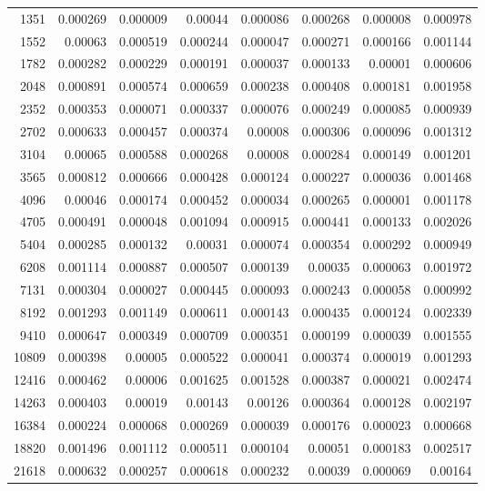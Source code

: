 \begin{tabular}{r r r r r r r r}
1351 & 0.000269 & 0.000009 & 0.00044 & 0.000086 & 0.000268 & 0.000008 & 0.000978 \\
1552 & 0.00063 & 0.000519 & 0.000244 & 0.000047 & 0.000271 & 0.000166 & 0.001144 \\
1782 & 0.000282 & 0.000229 & 0.000191 & 0.000037 & 0.000133 & 0.00001 & 0.000606 \\
2048 & 0.000891 & 0.000574 & 0.000659 & 0.000238 & 0.000408 & 0.000181 & 0.001958 \\
2352 & 0.000353 & 0.000071 & 0.000337 & 0.000076 & 0.000249 & 0.000085 & 0.000939 \\
2702 & 0.000633 & 0.000457 & 0.000374 & 0.00008 & 0.000306 & 0.000096 & 0.001312 \\
3104 & 0.00065 & 0.000588 & 0.000268 & 0.00008 & 0.000284 & 0.000149 & 0.001201 \\
3565 & 0.000812 & 0.000666 & 0.000428 & 0.000124 & 0.000227 & 0.000036 & 0.001468 \\
4096 & 0.00046 & 0.000174 & 0.000452 & 0.000034 & 0.000265 & 0.000001 & 0.001178 \\
4705 & 0.000491 & 0.000048 & 0.001094 & 0.000915 & 0.000441 & 0.000133 & 0.002026 \\
5404 & 0.000285 & 0.000132 & 0.00031 & 0.000074 & 0.000354 & 0.000292 & 0.000949 \\
6208 & 0.001114 & 0.000887 & 0.000507 & 0.000139 & 0.00035 & 0.000063 & 0.001972 \\
7131 & 0.000304 & 0.000027 & 0.000445 & 0.000093 & 0.000243 & 0.000058 & 0.000992 \\
8192 & 0.001293 & 0.001149 & 0.000611 & 0.000143 & 0.000435 & 0.000124 & 0.002339 \\
9410 & 0.000647 & 0.000349 & 0.000709 & 0.000351 & 0.000199 & 0.000039 & 0.001555 \\
10809 & 0.000398 & 0.00005 & 0.000522 & 0.000041 & 0.000374 & 0.000019 & 0.001293 \\
12416 & 0.000462 & 0.00006 & 0.001625 & 0.001528 & 0.000387 & 0.000021 & 0.002474 \\
14263 & 0.000403 & 0.00019 & 0.00143 & 0.00126 & 0.000364 & 0.000128 & 0.002197 \\
16384 & 0.000224 & 0.000068 & 0.000269 & 0.000039 & 0.000176 & 0.000023 & 0.000668 \\
18820 & 0.001496 & 0.001112 & 0.000511 & 0.000104 & 0.00051 & 0.000183 & 0.002517 \\
21618 & 0.000632 & 0.000257 & 0.000618 & 0.000232 & 0.00039 & 0.000069 & 0.00164 \\

\end{tabular}

